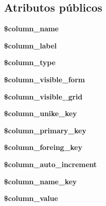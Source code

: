 \subsection*{Atributos públicos}
\begin{DoxyCompactItemize}
\item 
\mbox{\label{class_column_a57f31bb90514ea05399ac5e929fc4c47}} 
{\bfseries \$column\+\_\+name}
\item 
\mbox{\label{class_column_ab27e37f7030c6231f8f6ee9c1d2dd1ef}} 
{\bfseries \$column\+\_\+label}
\item 
\mbox{\label{class_column_ab6f889849db1bb83f542898440f935c4}} 
{\bfseries \$column\+\_\+type}
\item 
\mbox{\label{class_column_a5a1ff5ab37e8d624770158f25390081e}} 
{\bfseries \$column\+\_\+visible\+\_\+form}
\item 
\mbox{\label{class_column_a1f113b0029e28ee605b07f536c2aa158}} 
{\bfseries \$column\+\_\+visible\+\_\+grid}
\item 
\mbox{\label{class_column_a8c649570ee64400d60c838b74d7d466b}} 
{\bfseries \$column\+\_\+unike\+\_\+key}
\item 
\mbox{\label{class_column_a1d320a00e456f9043ffdceb89fa965f7}} 
{\bfseries \$column\+\_\+primary\+\_\+key}
\item 
\mbox{\label{class_column_a8efbe625b6c5cd72addd344a8b4aee8b}} 
{\bfseries \$column\+\_\+foreing\+\_\+key}
\item 
\mbox{\label{class_column_a68f87ac3a1baeae3255a7c9092ee7f0e}} 
{\bfseries \$column\+\_\+auto\+\_\+increment}
\item 
\mbox{\label{class_column_aa9b19210ef2cd19e7dd7b5d0a7375042}} 
{\bfseries \$column\+\_\+name\+\_\+key}
\item 
\mbox{\label{class_column_a61e58949eedf5143ece9e0e6f704ded5}} 
{\bfseries \$column\+\_\+value}
\item 

\end{DoxyCompactItemize}
